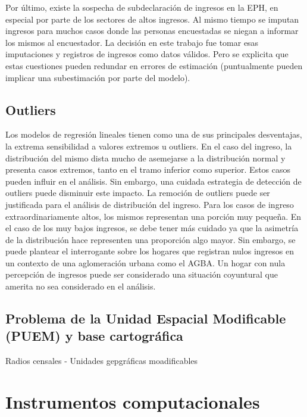 Por último, existe la sospecha de subdeclaración de ingresos en la EPH, en especial por parte de los sectores de altos ingresos. Al mismo tiempo se imputan ingresos para muchos casos donde las personas encuestadas se niegan a informar los mismos al encuestador. La decisión en este trabajo fue tomar esas imputaciones y registros de ingresos como datos válidos. Pero se explicita que estas cuestiones pueden redundar en errores de estimación (puntualmente pueden implicar una subestimación por parte del modelo).
	
	\subsection{Outliers}
	
Los modelos de regresión lineales tienen como una de sus principales desventajas, la extrema sensibilidad a valores extremos u outliers. En el caso del ingreso, la distribución del mismo dista mucho de asemejarse a la distribución normal y presenta casos extremos, tanto en el tramo inferior como superior. Estos casos pueden influir en el análisis. Sin embargo, una cuidada estrategia de detección de outliers puede disminuir este impacto. La remoción de outliers puede ser justificada para el análisis de distribución del ingreso. Para los casos de ingreso extraordinariamente altos, los mismos representan una porción muy pequeña. En el caso de los muy bajos ingresos, se debe tener más cuidado  ya que la asimetría de la distribución hace representen una proporción algo mayor. Sin embargo, se puede plantear el interrogante sobre los hogares que registran nulos ingresos en un contexto de una aglomeración urbana como el AGBA. Un hogar con nula percepción de ingresos puede ser considerado una situación coyuntural que amerita no sea considerado en el análisis.  


	\subsection{Problema   de   la   Unidad   Espacial   Modificable   (PUEM) y base cartográfica}


Radios censales - Unidades gepgráficas moadificables

	
	\section{Instrumentos computacionales}
	
